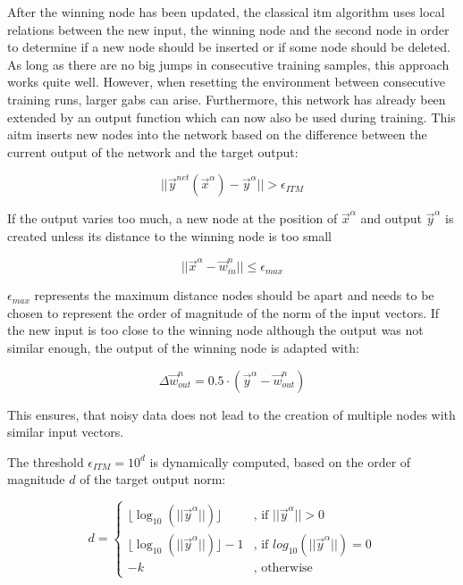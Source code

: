 After the winning node has been updated, the classical \gls{itm} algorithm uses local relations between the new input, the winning node and the second node in order to determine if a new node should be inserted or if some node should be deleted. As long as there are no big jumps in consecutive training samples, this approach works quite well. However, when resetting the environment between consecutive training runs, larger gabs can arise. Furthermore, this network has already been extended by an output function which can now also be used during training. This \gls{aitm} inserts new nodes into the network based on the difference between the current output of the network and the target output:

\begin{equation}
||\vec{y}^{net}(\vec{x}^\alpha)-\vec{y}^\alpha|| > \epsilon_{ITM}
\label{eq:newNode}
\end{equation}

If the output varies too much, a new node at the position of $\vec{x}^\alpha$ and output $\vec{y}^\alpha$ is created unless its distance to the winning node is too small

\begin{equation}
||\vec{x}^\alpha - \vec{w}^n_{in}|| \le \epsilon_{max}
\end{equation}

$\epsilon_{max}$ represents the maximum distance nodes should be apart and needs to be chosen to represent the order of magnitude of the norm of the input vectors.
If the new input is too close to the winning node although the output was not similar enough, the output of the winning node is adapted with:

\begin{equation}
\Delta\vec{w}^n_{out} = 0.5 \cdot (\vec{y}^\alpha - \vec{w}^n_{out})
\end{equation}

This ensures, that noisy data does not lead to the creation of multiple nodes with similar input vectors. 

The threshold $\epsilon_{ITM} = 10^d$ is dynamically computed, based on the order of magnitude $d$ of the target output norm:

\begin{equation}
d = \begin{cases}
\lfloor\log_{10}(||\vec{y}^\alpha||)\rfloor & \text{, if $||\vec{y}^\alpha|| > 0$} \\
\lfloor\log_{10}(||\vec{y}^\alpha||)\rfloor-1 & \text{, if $log_{10}(||\vec{y}^\alpha||) = 0$} \\
-k & \text{, otherwise}
\end{cases}
\end{equation}

